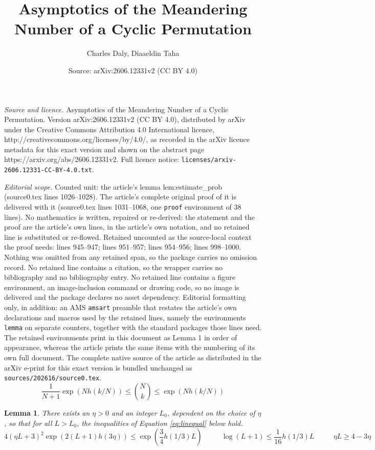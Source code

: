 \documentclass[10pt,a4paper]{amsart}
\title{Asymptotics of the Meandering Number of a Cyclic Permutation}
\author{Charles Daly, Diaaeldin Taha}
\date{Source: arXiv:2606.12331v2 (CC BY 4.0)}
\newtheorem{lemma}{Lemma}
\begin{document}
\maketitle

\noindent\emph{Source and licence.} Asymptotics of the Meandering Number of a Cyclic Permutation. Version arXiv:2606.12331v2 (CC BY 4.0), distributed by arXiv under the Creative Commons Attribution 4.0 International licence, http://creativecommons.org/licenses/by/4.0/, as recorded in the arXiv licence metadata for this exact version and shown on the abstract page https://arxiv.org/abs/2606.12331v2. Full licence notice: \texttt{licenses/arxiv-2606.12331-CC-BY-4.0.txt}.\par\smallskip

\noindent\textit{Editorial scope.} Counted unit: the article's lemma lem:estimate\_prob (source0.tex lines 1026--1028). The article's complete original proof of it is delivered with it (source0.tex lines 1031--1068, one \texttt{proof} environment of 38 lines). No mathematics is written, repaired or re-derived: the statement and the proof are the article's own lines, in the article's own notation, and no retained line is substituted or re-flowed.  Retained uncounted as the source-local context the proof needs: lines 945--947; lines 951--957; lines 954--956; lines 998--1000.  Nothing was omitted from any retained span, so the package carries no omission record.  No retained line contains a citation, so the wrapper carries no bibliography and no bibliography entry.  No retained line contains a figure environment, an image-inclusion command or drawing code, so no image is delivered and the package declares no asset dependency.  Editorial formatting only, in addition: an AMS \texttt{amsart} preamble that restates the article's own declarations and macros used by the retained lines, namely the environments \texttt{lemma} on separate counters, together with the standard packages those lines need.  The retained environments print in this document as Lemma 1 in order of appearance, whereas the article prints the same items with the numbering of its own full document.  The complete native source of the article as distributed in the arXiv e-print for this exact version is bundled unchanged as \texttt{sources/202616/source0.tex}.
\begin{equation}\label{eq:binest}
\frac{1}{N+1}\exp\left(Nh(k/N)\right) \leq \binom{N}{k} \leq \exp\left(Nh(k/N)\right)
\end{equation}

\begin{lemma}\label{lem:binent}
There exists an $\eta > 0$ and an integer $L_{0}$, dependent on the choice of $\eta$, so that for all $L > L_{0}$, the inequalities of Equation \ref{eq:linequal} below hold. 
\begin{equation}\label{eq:linequal}
4\left(\eta L + 3\right)^{2}\exp\left(2(L+1)h(3\eta)\right) \leq \exp\left(\frac{3}{4}h(1/3)L\right) \phantom{==} \log(L+1) \leq \frac{1}{16}h(1/3)L \phantom{==} \eta L \geq 4-3\eta
\end{equation} 
\end{lemma}
\end{document}
